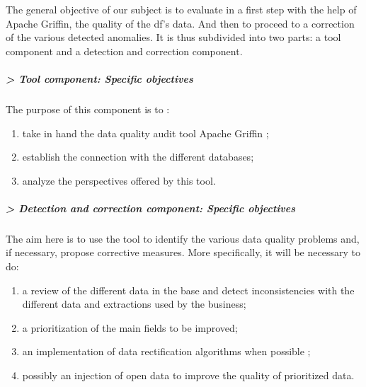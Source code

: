 The general objective of our subject is to evaluate in a first step with the help of Apache Griffin, the quality of the \acrlong{df}'s data. And then to proceed to a correction of the various detected anomalies. It is thus subdivided into two parts:
a tool component and a detection and correction component.
\subparagraph{\textbf{> Tool component: Specific objectives}} The purpose of this component is to :
\begin{enumerate}[parsep=0cm,itemsep=0cm]
    \item take in hand the data quality audit tool Apache Griffin ;
    \item establish the connection with the different databases;
    \item analyze the perspectives offered by this tool.
\end{enumerate}
\subparagraph{\textbf{> Detection and correction component: Specific objectives}} The aim here is to use the tool to identify the various data quality problems and, if necessary, propose corrective measures. More specifically, it will be necessary to do:
\begin{enumerate}[parsep=0cm,itemsep=0cm]
    \item a review of the different data in the base and detect inconsistencies with the different data and extractions used by the business;
    \item a prioritization of the main fields to be improved;
    \item an implementation of data rectification algorithms when possible ;
    \item possibly an injection of open data to improve the quality of prioritized data.
\end{enumerate}

